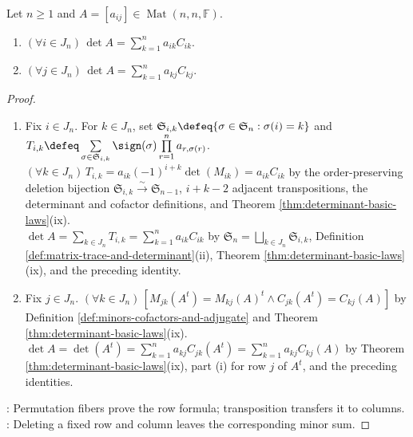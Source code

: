 \begin{lemma} \label{lem:cofactor-expansion} \\
Let $n\geq1$ and $A=[a_{ij}]\in\operatorname{Mat}(n,n,\mathbb{F})$.
\begin{enumerate}[label=(\roman*)]
\setlength{\itemsep}{0pt}
\item $(\forall i\in J_n)\,\det A=\sum\limits_{k=1}^{n}a_{ik}C_{ik}$.
\item $(\forall j\in J_n)\,\det A=\sum\limits_{k=1}^{n}a_{kj}C_{kj}$.
\end{enumerate}
\begin{proof}
\begin{enumerate}[label=(\roman*)]
\setlength{\itemsep}{0pt}
\item Fix $i\in J_n$. For $k\in J_n$, set $\mathfrak{S}_{i,k}\defeq\{\sigma\in\mathfrak{S}_n:\sigma(i)=k\}$ and $T_{i,k}\defeq\sum\limits_{\sigma\in\mathfrak{S}_{i,k}}\sign(\sigma)\prod\limits_{r=1}^{n}a_{r,\sigma(r)}$.\\
$(\forall k\in J_n)\,T_{i,k}=a_{ik}(-1)^{i+k}\det(M_{ik})=a_{ik}C_{ik}$ by the order-preserving deletion bijection $\mathfrak{S}_{i,k}\xrightarrow{\sim}\mathfrak{S}_{n-1}$, $i+k-2$ adjacent transpositions, the determinant and cofactor definitions, and Theorem \ref{thm:determinant-basic-laws}(ix).\\
$\det A=\sum\limits_{k\in J_n}T_{i,k}=\sum\limits_{k=1}^{n}a_{ik}C_{ik}$ by $\mathfrak{S}_n=\bigsqcup\limits_{k\in J_n}\mathfrak{S}_{i,k}$, Definition \ref{def:matrix-trace-and-determinant}(ii), Theorem \ref{thm:determinant-basic-laws}(ix), and the preceding identity.
\item Fix $j\in J_n$. $(\forall k\in J_n)\,[M_{jk}(A^t)=M_{kj}(A)^t\land C_{jk}(A^t)=C_{kj}(A)]$ by Definition \ref{def:minors-cofactors-and-adjugate} and Theorem \ref{thm:determinant-basic-laws}(ix).\\
$\det A=\det(A^t)=\sum\limits_{k=1}^{n}a_{kj}C_{jk}(A^t)=\sum\limits_{k=1}^{n}a_{kj}C_{kj}(A)$ by Theorem \ref{thm:determinant-basic-laws}(ix), part (i) for row $j$ of $A^t$, and the preceding identities.
\end{enumerate}
: Permutation fibers prove the row formula; transposition transfers it to columns.\\
: Deleting a fixed row and column leaves the corresponding minor sum.
\end{proof}
\end{lemma}

